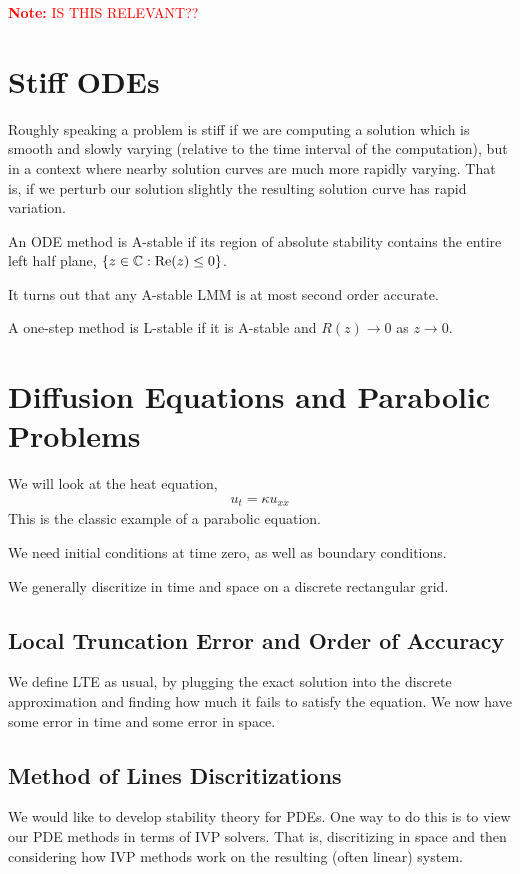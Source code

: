 \documentclass[12pt]{article}
\newcommand{\note}[1]{\textcolor{red}{\textbf{Note:} #1}}
\begin{document}
\note{IS THIS RELEVANT??}

\section{Stiff ODEs}

Roughly speaking a problem is stiff if we are computing a solution which is smooth and slowly varying (relative to the time interval of the computation), but in a context where nearby solution curves are much more rapidly varying. That is, if we perturb our solution slightly the resulting solution curve has rapid variation.

\begin{definition}[A-stability]
    An ODE method is A-stable if its region of absolute stability contains the entire left half plane, \( \{z\in\mathbb{C} : \operatorname{Re}(z) \leq 0 \} \).
\end{definition}

It turns out that any A-stable LMM is at most second order accurate.

\begin{definition}[L-stablity]
    A one-step method is L-stable if it is A-stable and \( R(z) \to 0 \) as \( z\to 0 \).
\end{definition}

\section{Diffusion Equations and Parabolic Problems}

We will look at the heat equation,
\begin{align*}
    u_t = \kappa u_{xx}
\end{align*}
This is the classic example of a parabolic equation.

We need initial conditions at time zero, as well as boundary conditions.

We generally discritize in time and space on a discrete rectangular grid.

\subsection{Local Truncation Error and Order of Accuracy}
We define LTE as usual, by plugging the exact solution into the discrete approximation and finding how much it fails to satisfy the equation. We now have some error in time and some error in space.

\subsection{Method of Lines Discritizations}
We would like to develop stability theory for PDEs. One way to do this is to view our PDE methods in terms of IVP solvers. That is, discritizing in space and then considering how IVP methods work on the resulting (often linear) system.
\end{document}
